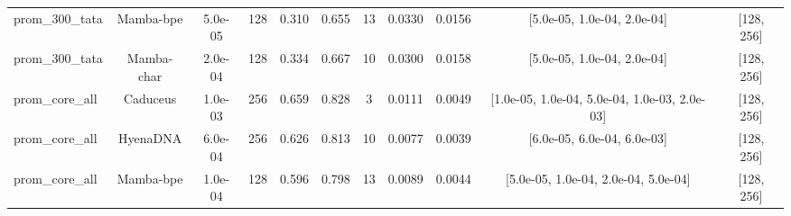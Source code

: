 \begin{landscape}
\begin{table}[]
\begin{tabular}{@{}lcccccccccc@{}}
prom\_300\_tata & Mamba-bpe & 5.0e-05 & 128 & 0.310 & 0.655 & 13 & 0.0330 & 0.0156 & [5.0e-05, 1.0e-04, 2.0e-04] & [128, 256] \\
prom\_300\_tata & Mamba-char & 2.0e-04 & 128 & 0.334 & 0.667 & 10 & 0.0300 & 0.0158 & [5.0e-05, 1.0e-04, 2.0e-04] & [128, 256] \\
prom\_core\_all & Caduceus & 1.0e-03 & 256 & 0.659 & 0.828 & 3 & 0.0111 & 0.0049 & [1.0e-05, 1.0e-04, 5.0e-04, 1.0e-03, 2.0e-03] & [128, 256] \\
prom\_core\_all & HyenaDNA & 6.0e-04 & 256 & 0.626 & 0.813 & 10 & 0.0077 & 0.0039 & [6.0e-05, 6.0e-04, 6.0e-03] & [128, 256] \\
prom\_core\_all & Mamba-bpe & 1.0e-04 & 128 & 0.596 & 0.798 & 13 & 0.0089 & 0.0044 & [5.0e-05, 1.0e-04, 2.0e-04, 5.0e-04] & [128, 256] \\
\bottomrule
\end{tabular}
\end{table}
\end{landscape}

